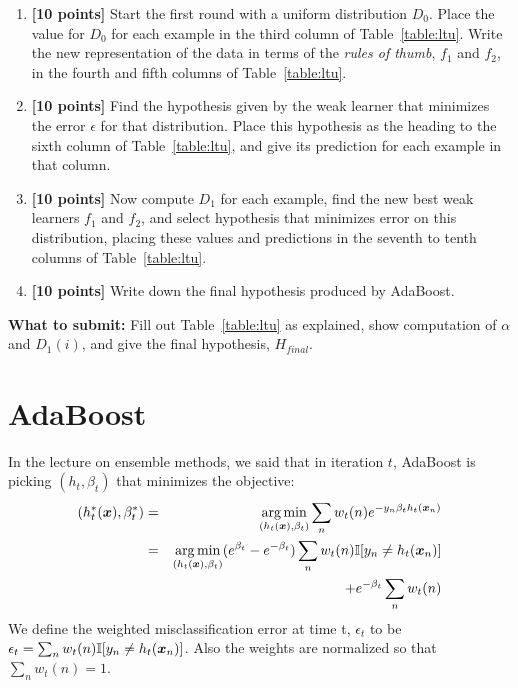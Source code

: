 \documentclass[11pt]{article}
\begin{document}
  \begin{enumerate}
  \item {\bf [10 points]}  Start the first round with a uniform distribution $D_0$.  Place the value for
    $D_0$ for each example in the third column of Table~\ref{table:ltu}.
Write the new representation of the data in terms of the {\em rules of thumb}, $f_1$ and $f_2$, in the fourth and fifth columns of Table~\ref{table:ltu}.

  \item {\bf [10 points]}
    Find the hypothesis given by the weak learner that minimizes the error
    $\epsilon$ for that distribution.  Place this hypothesis as the heading to the
    sixth column of Table~\ref{table:ltu}, and give its prediction for each example in that column.

   \item {\bf [10 points]} Now compute $D_1$ for each example, find the new best weak learners $f_1$ and $f_2$, and select hypothesis that
    minimizes error on this distribution, placing these values and
    predictions in the seventh to tenth columns of Table~\ref{table:ltu}.

  \item {\bf [10 points]} Write down the final hypothesis produced by AdaBoost.

\end{enumerate}

\textbf{What to submit:} Fill out Table~\ref{table:ltu} as explained, show computation of $\alpha$ and $D_1(i)$, and give the final hypothesis, $H_{\textit{final}}$.



\solution{
}


\iffalse
\section{AdaBoost }

In the lecture on ensemble methods, we said that in iteration $t$, AdaBoost is picking $(h_t, \beta_t)$ that minimizes the objective:
\begin{eqnarray*}
(h_t^*(\boldsymbol{x}), \beta_t^*) & = & \operatorname*{arg\,min}_{(h_t(\boldsymbol{x}), \beta_t)}\sum_n w_t(n) e^{-y_n \beta_t h_t(\boldsymbol{x}_n)} \\ 
& =& \operatorname*{arg\,min}_{(h_t(\boldsymbol{x}), \beta_t)}(e^{\beta_t}- e^{-\beta_t})  \sum_n w_t(n)\mathbb{I}[y_n \ne h_t(\boldsymbol{x}_n)] \\
&& \qquad\qquad\qquad\qquad\qquad + e^{-\beta_t} \sum_n w_t(n)
\end{eqnarray*}
We define the weighted misclassification error at time t, $\epsilon_t$ to be $\epsilon_t = \sum_n w_t(n)\mathbb{I}[y_n \ne h_t(\boldsymbol{x}_n)]$. Also the weights are normalized so that $\sum_n w_t(n)=1$. 
\end{document}
